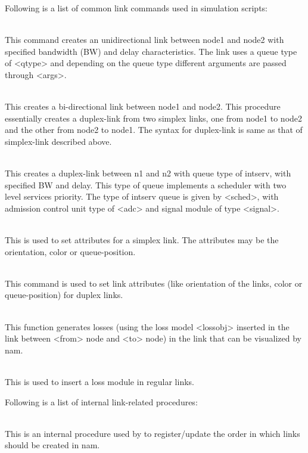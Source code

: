 Following is a list of common link commands used in simulation scripts:
\begin{flushleft}

\\
This command creates an unidirectional link between node1 and node2 with
specified bandwidth (BW) and delay characteristics. The link uses a queue
type of <qtype> and depending on the queue type different arguments are
passed through <args>.


\\
This creates a bi-directional link between node1 and node2. This procedure
essentially creates a duplex-link from two simplex links, one from node1
to node2 and the other from node2 to node1. The syntax for duplex-link is
same as that of simplex-link described above.


\\
This creates a duplex-link between n1 and n2 with queue type of intserv, with
specified BW and delay. This type of queue implements a scheduler with two
level services priority. The type of intserv queue is given by <sched>, with
admission control unit type of <adc> and signal module of type <signal>.


\\
This is used to set attributes for a simplex link. The attributes may be
the orientation, color or queue-position.


\\
This command is used to set link attributes (like orientation of the links,
color or queue-position) for duplex links.


\\
This function generates losses (using the loss model <lossobj> inserted in
the link between <from> node and <to> node) in the link that can be
visualized by nam.


\\
This is used to insert a loss module in regular links.



Following is a list of internal link-related procedures:

\\
This is an internal procedure used by  to 
register/update the order in which links should be created in nam.



\end{flushleft}
